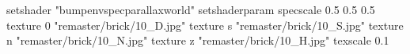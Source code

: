 setshader "bumpenvspecparallaxworld"
setshaderparam specscale 0.5 0.5 0.5
    texture 0 "remaster/brick/10_D.jpg"
    texture s "remaster/brick/10_S.jpg"
    texture n "remaster/brick/10_N.jpg"
    texture z "remaster/brick/10_H.jpg"
    texscale 0.1